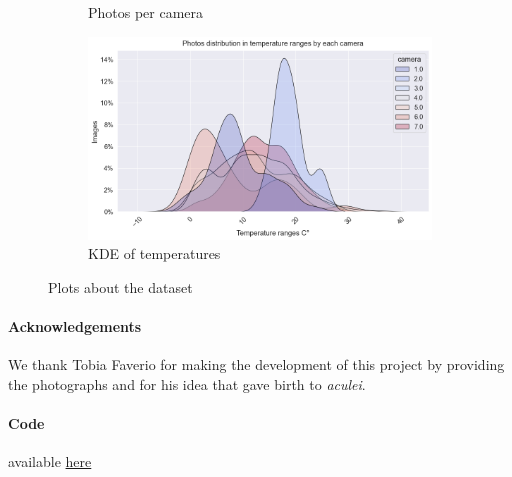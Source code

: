 \documentclass[12pt,a4paper,twoside]{article}
\begin{document}
\begin{figure}[!ht]
\begin{subfigure}{0.45\textwidth}
        \caption{Photos per camera}
        \label{fig:sub3}
    \end{subfigure}
    \hfill
    \begin{subfigure}{0.45\textwidth}
        \includegraphics[width=\linewidth]{assets/temperature-dist.png}
        \caption{KDE of temperatures}
        \label{fig:sub4}
    \end{subfigure}
    \label{fig:grid}
    \caption{Plots about the dataset}
\end{figure}

\paragraph{Acknowledgements} We thank Tobia Faverio for making the development of this project by providing the photographs and for his idea that gave birth to \textit{aculei}.

\paragraph{Code} available \href{https://github.com/micheledinelli/aculei-ai}{here}

\newpage
\begin{refcontext}[sorting=none]
    \printbibliography
\end{refcontext}
\end{document}

